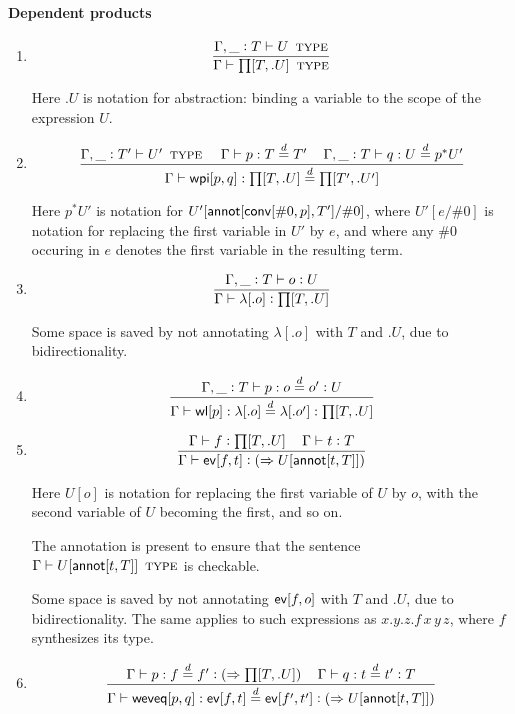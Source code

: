 \documentclass[11pt]{article}
\newcommand{\eqd}{\stackrel{d}{=}}
\newcommand{\spc}{{\,\,\,\,\,\,\,}}
\newcommand{\ccolon}[1]{\vcentcolon#1}
\newcommand{\synth}[1]{\vcentcolon(\Rightarrow#1)} %
\newcommand{\ccheck}[1]{\vcentcolon#1}  %
\newcommand{\Type}{\mathop{\text{ \sc type}}}
\newcommand{\ha}[2]{#1[#2]}
\newcommand{\annot}{{\sf annot}}
\newcommand{\conv}{{\sf conv}}
\newcommand{\ev}{{\sf ev}}
\newcommand{\weveq}{{\sf weveq}}
\newcommand{\wl}{{\sf wl}}
\newcommand{\wpi}{{\sf wpi}}
\newcommand{\var}{\char`_}
\begin{document}
\paragraph{Dependent products}

\begin{enumerate}

\item 
$$\frac{\Gamma, \var \ccolon{T}\vdash U\Type}{\Gamma\vdash \ha\prod{T,.U}\Type}$$

Here $.U$ is notation for abstraction: binding a variable to the scope of the expression $U$.

\item 
$$ \frac{ 
  \Gamma, \var \ccolon{T'} \vdash U'  \Type      \spc 
  \Gamma     \vdash p:T \eqd T'    \spc
  \Gamma,  \var \ccolon{T}  \vdash q:U \eqd p^*U'
  } {
  \Gamma     \vdash \ha\wpi{p,q}:\ha\prod{T,.U}\eqd \ha\prod{T',.U'}
}$$

Here ${p}^*U'$ is notation for $U'[\ha\annot{\ha\conv{\#0,p},T'}/\#0]$, where
$U'[e/\#0]$ is notation for replacing the first variable in $U'$ by $e$, and
where any $\#0$ occuring in $e$ denotes the first variable in the resulting
term.

\item 
$$\frac{\Gamma, \var \ccolon{T}\vdash o \ccheck{U}}{\Gamma\vdash \ha\lambda{.o} \ccheck{\ha\prod{T,.U}}}$$

Some space is saved by not annotating $\ha\lambda{.o}$ with $T$ and $.U$, due to bidirectionality.

\item 
$$\frac{\Gamma, \var \ccolon{T}\vdash p : o\eqd o' \ccheck{U}}{\Gamma\vdash \ha\wl{p} : \ha\lambda{.o}\eqd \ha\lambda{.o'} : \ha\prod{T,.U}}$$

\item 
$$\frac{\Gamma\vdash f \ccolon{\ha\prod{T,.U}}\spc \Gamma\vdash t \ccheck{T}}{\Gamma\vdash \ha\ev{f,t} \synth{U[\ha\annot{t,T}]}}$$

Here $U[o]$ is notation for replacing the first variable of $U$ by $o$, with
the second variable of $U$ becoming the first, and so on.  

The annotation is present to ensure that the sentence $\Gamma \vdash
U[\ha\annot{t,T}] \Type$ is checkable.

Some space is saved by not annotating $\ha\ev{f,o}$ with $T$ and $.U$, due to
bidirectionality.  The same applies to such expressions as $x.y.z.f\, x\, y\,
z$, where $f$ synthesizes its type.

\item 
$$\frac{
   \Gamma\vdash p : f \eqd f' \synth{\ha\prod{T,.U}}\spc 
   \Gamma\vdash q : t \eqd t' \ccheck{T}
   }{
   \Gamma\vdash \ha\weveq{p,q} : \ha\ev{f,t} \eqd \ha\ev{f',t'} \synth{U[\ha\annot{t,T}]}
  }$$


\end{enumerate}
\end{document}
